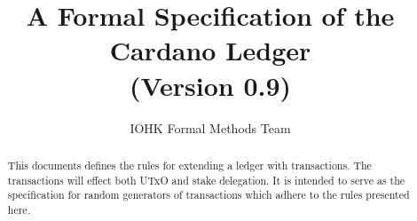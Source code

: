 
\title{A Formal Specification of the Cardano Ledger \\
       {\small (Version 0.9)}}

\author{IOHK Formal Methods Team}


\maketitle

\begin{abstract}
This documents defines the rules for extending a ledger with transactions.
The transactions will effect both UTxO and stake delegation.
It is intended to serve as the specification for random generators of transactions
which adhere to the rules presented here.
\end{abstract}
